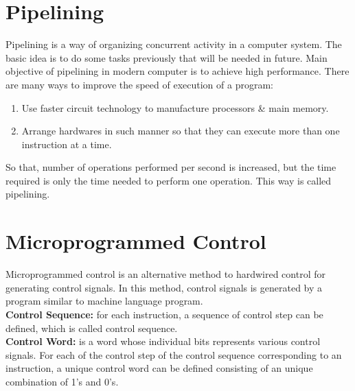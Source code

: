 \documentclass[12 pt, letterpaper]{extarticle}
\begin{document}
\section*{Pipelining}
Pipelining is a way of organizing concurrent activity in a computer system. The basic idea is to do some tasks previously that will be needed in future.
Main objective of pipelining in modern computer is to achieve high performance.
There are many ways to improve the speed of execution of a program:
\begin{enumerate}
	\item Use faster circuit technology to manufacture processors \& main memory.
	\item Arrange hardwares in such manner so that they can execute more than one instruction at a time.
\end{enumerate}
So that, number of operations performed per second is increased, but the time required is only the time needed to perform one operation. This way is called pipelining.


\section*{Microprogrammed Control}
Microprogrammed control is an alternative method to hardwired control for generating control signals.
In this method, control signals is generated by a program similar to machine language program.\\
\textbf{Control Sequence: } for each instruction, a sequence of control step can be defined, which is called control sequence.\\
\textbf{Control Word: } is a word whose individual bits represents various control signals. For each of the control step of the control sequence corresponding to an instruction, a unique control word can be defined consisting of an unique combination of 1's and 0's.\\
\end{document}
